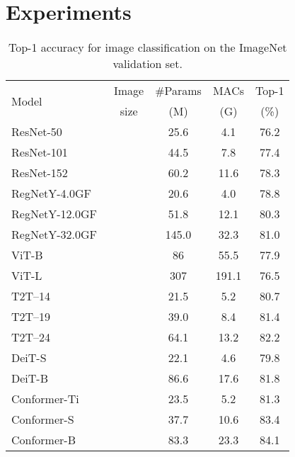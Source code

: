 \documentclass[10pt,twocolumn,letterpaper]{article}
\begin{document}
\section{Experiments}
\begin{table}[t]
\begin{center}
\begin{tabular}{l|c|cc|c }
\toprule
\multirow{2}{*}{Model}  & Image &   \#Params   &   MACs   &  Top-1  \\
&  size& (M) & (G) & (\%) \\
 \midrule
ResNet-50~\cite{ResNet2016} &  & 25.6 & 4.1  & 76.2 \\
ResNet-101~\cite{ResNet2016} &  & 44.5 & 7.8 &  77.4 \\
ResNet-152~\cite{ResNet2016} &  & 60.2 & 11.6& 78.3 \\
RegNetY-4.0GF~\cite{RegNet2020} &  & 20.6 & 4.0 & 78.8 \\
RegNetY-12.0GF~\cite{RegNet2020} &  & 51.8 & 12.1 & 80.3 \\
RegNetY-32.0GF~\cite{RegNet2020} &  & 145.0 & 32.3 & 81.0 \\
\midrule
ViT-B~\cite{ViT2020} &  & 86 & 55.5 & 77.9 \\
ViT-L~\cite{ViT2020} &  & 307 & 191.1 & 76.5 \\
T2T--14~\cite{T2TViT2021} &  & 21.5 & 5.2& 80.7\\
T2T--19~\cite{T2TViT2021} &  & 39.0 & 8.4& 81.4\\
T2T--24~\cite{T2TViT2021} &  & 64.1 & 13.2& 82.2\\ 
DeiT-S~\cite{DeiT2020} &  & 22.1 & 4.6& 79.8 \\
DeiT-B~\cite{DeiT2020} &  & 86.6 & 17.6&  81.8 \\ 
\midrule
Conformer-Ti &  & 23.5 & 5.2 & 81.3\\
Conformer-S &  & 37.7 & 10.6 & 83.4\\
Conformer-B &  &  83.3 &  23.3 & 84.1 \\

\bottomrule
\end{tabular}
\end{center}
\vspace{-1em}
\caption{Top-1 accuracy for image classification on the ImageNet validation set.}
\label{tab:classification}
\end{table}
\end{document}
